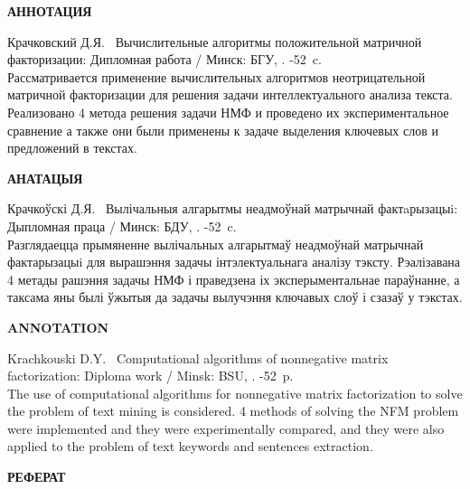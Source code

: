 \def\npages{52}
\def\ntables{2}
\def\nris{4}
\def\ncite{14}



\begin{center}
  \fontsize{16pt}{0em}\textbf{АННОТАЦИЯ}
\end{center}

Крачковский Д.Я. \ Вычислительные алгоритмы положительной матричной факторизации: Дипломная работа / Минск: БГУ, \the\year. -\npages\ c.
\\

Рассматривается применение вычислительных алгоритмов неотрицательной матричной факторизации для решения задачи интеллектуального анализа текста.
Реализовано 4 метода решения задачи НМФ и проведено их экспериментальное сравнение а также они были применены к задаче выделения ключевых слов и предложений в текстах.



\begin{center}
  \fontsize{16pt}{0em}\textbf{АНАТАЦЫЯ}
\end{center}

Крачкоўскі Д.Я. \ Вылічальныя алгарытмы неадмоўнай матрычнай фактaрызацыi: Дыпломная праца / Минск: БДУ, \the\year. -\npages\ c.
\\

Разглядаецца прымяненне вылічальных алгарытмаў неадмоўнай матрычнай фактарызацыi для вырашэння задачы інтэлектуальнага аналізу тэксту.
Рэалізавана 4 метады рашэння задачы НМФ і праведзена іх эксперыментальнае параўнанне, а таксама яны былі ўжытыя да задачы вылучэння ключавых слоў і сзазаў у тэкстах.


\begin{center}
  \fontsize{16pt}{0em}\textbf{ANNOTATION}
\end{center}

Krachkouski D.Y. \ Computational algorithms of nonnegative matrix factorization: Diploma work / Minsk: BSU, \the\year. -\npages\ p.
\\

The use of computational algorithms for nonnegative matrix factorization to solve the problem of text mining is considered.
4 methods of solving the NFM problem were implemented and they were experimentally compared, and they were also applied to the problem of text keywords and sentences extraction.

\newpage



\begin{center}
  \fontsize{16pt}{0em}\textbf{РЕФЕРАТ}
\end{center}

